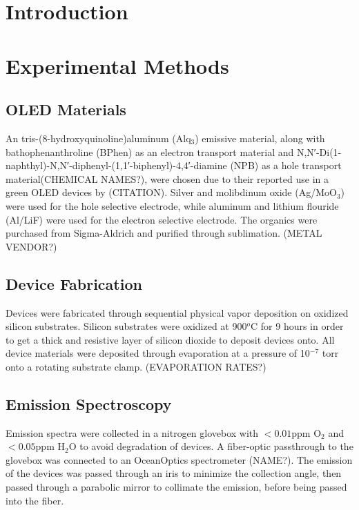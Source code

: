 \documentclass{report}
\begin{document}
\tableofcontents

\chapter{Introduction}

\chapter{Experimental Methods}

    \section{OLED Materials}
    An tris-(8-hydroxyquinoline)aluminum (Alq$_3$) emissive material, along with bathophenanthroline (BPhen) as an electron transport material and N,N′-Di(1-naphthyl)-N,N′-diphenyl-(1,1′-biphenyl)-4,4′-diamine (NPB) as a hole transport material(CHEMICAL NAMES?), were chosen due to their reported use in a green OLED devices by (CITATION). Silver and molibdinum oxide (Ag/MoO$_3$) were used for the hole selective electrode, while aluminum and lithium flouride (Al/LiF) were used for the electron selective electrode. The organics were purchased from Sigma-Aldrich and purified through sublimation. (METAL VENDOR?)

    \section{Device Fabrication}
    Devices were fabricated through sequential physical vapor deposition on oxidized silicon substrates. Silicon substrates were oxidized at 900$^o$C for 9 hours in order to get a thick and resistive layer of silicon dioxide to deposit devices onto. All device materials were deposited through evaporation at a pressure of 10$^{-7}$ torr onto a rotating substrate clamp. (EVAPORATION RATES?)

    \section{Emission Spectroscopy}
    Emission spectra were collected in a nitrogen glovebox with $<0.01$ppm O$_2$ and $<0.05$ppm H$_2$O to avoid degradation of devices. A fiber-optic passthrough to the glovebox was connected to an OceanOptics spectrometer (NAME?). The emission of the devices was passed through an iris to minimize the collection angle, then passed through a parabolic mirror to collimate the emission, before being passed into the fiber.
\end{document}

